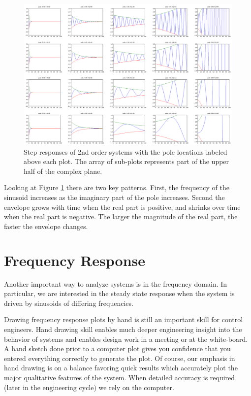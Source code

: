 \begin{figure}\centering
\includegraphics[width=6.5in]{figs05/s_plane_responsesa.png}
\caption{Step responses of 2nd order systems with the pole locations labeled above each plot. The array of sub-plots represents part of the upper half of the complex plane.}\label{splaneresponse}
\end{figure}


Looking at Figure \ref{splaneresponse} there are two key patterns.  First, the frequency of the sinusoid increases as the imaginary part of the pole increases.  Second the envelope grows with time when the real part is positive, and shrinks over time when the real part is negative.   The larger the magnitude of the real part, the faster the envelope changes.



\section{Frequency Response}\label{FrequencyResponseSection}

Another important way to analyze systems is in the frequency domain.   In particular, we are interested in the steady state response when the system is driven by  sinusoids of differing frequencies.

Drawing frequency response plots by hand is still an important skill for control engineers.  Hand drawing skill enables much deeper engineering insight into the behavior of systems and enables design work in a meeting or at the white-board.  A hand sketch done prior to a computer plot gives you confidence that you entered everything correctly to generate the plot.  Of course, our emphasis in hand drawing  is on a balance favoring quick results which accurately plot the major qualitative features of the system.  When detailed accuracy is required (later in the engineering cycle) we rely on the computer.

